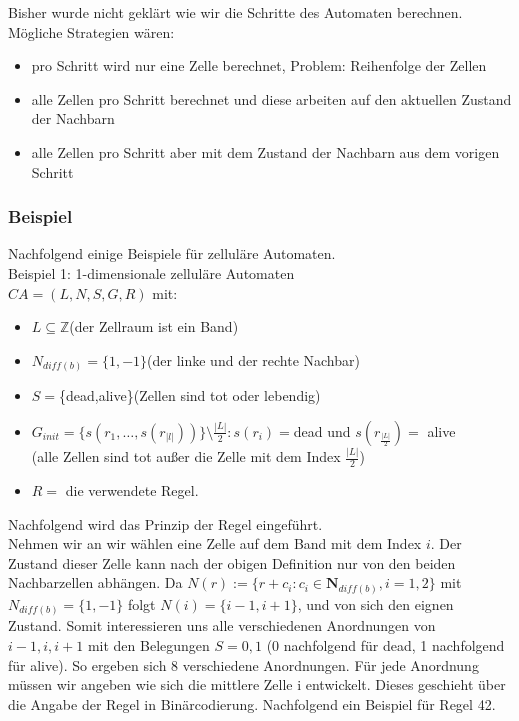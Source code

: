 \documentclass[11pt, fleqn, a4paper, leqno]{scrartcl} %
\begin{document}
		Bisher wurde nicht geklärt wie wir die Schritte des Automaten berechnen. Mögliche Strategien wären:
		\begin{itemize}
			\item pro Schritt wird nur eine Zelle berechnet, Problem: Reihenfolge der Zellen
			\item alle Zellen pro Schritt berechnet und diese arbeiten auf den aktuellen Zustand der Nachbarn
			\item alle Zellen pro Schritt aber mit dem Zustand der Nachbarn aus dem vorigen Schritt
		\end{itemize}
	\subsubsection{Beispiel}
		Nachfolgend einige Beispiele für zelluläre Automaten.\\
		Beispiel 1: 1-dimensionale zelluläre Automaten\\
		$CA = (L,N,S,G,R)$ mit:
		\begin{itemize}
			\item $L \subseteq \mathds{Z}$(der Zellraum ist ein Band)
			\item $N_{diff(b)} = \{1,-1\}$(der linke und der rechte Nachbar)
			\item $S =$\{dead,alive\}(Zellen sind tot oder lebendig)
			\item  $G_{init} = \{s(r_{1},\dots,s(r_{ |l|}))\}\setminus \frac{|L|}{2}:s(r_{i})=$dead und $s(r_{\frac{|L|}{2}})=$ alive\\ 
			(alle Zellen sind tot außer die Zelle mit dem Index $\frac{|L|}{2}$)
			\item $R=$ die verwendete Regel.
		\end{itemize}
		Nachfolgend wird das Prinzip der Regel eingeführt.\\
		Nehmen wir an wir wählen eine Zelle auf dem Band mit dem Index $i$. Der Zustand dieser Zelle kann nach der obigen Definition nur von den beiden Nachbarzellen abhängen.
		Da  $N(r) := \{r+c_{i}:c_{i} \in \mathbf{N}_{diff(b)}, i = 1,2\}$ mit $N_{diff(b)} = \{1,-1\}$ folgt $N(i)=\{i-1,i+1\}$, und von sich den eignen Zustand. Somit interessieren uns alle verschiedenen Anordnungen von $i-1,i,i+1$ mit den Belegungen $S={0,1}$ (0 nachfolgend für dead, 1 nachfolgend für alive). So ergeben sich 8 verschiedene Anordnungen. Für jede Anordnung müssen wir angeben wie sich die mittlere Zelle i entwickelt. Dieses geschieht über die Angabe der Regel in Binärcodierung. Nachfolgend ein Beispiel für Regel 42. \\
\end{document}
